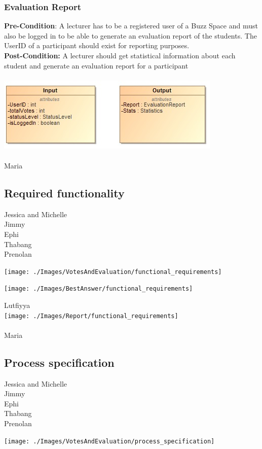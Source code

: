 \documentclass[a4paper,11pt]{article}
\begin{document}
\subsubsection{Evaluation Report}
\textbf{Pre-Condition}: A lecturer has to be a registered user of a Buzz Space and must also be logged in to be able to generate an evaluation report of the students. The UserID of a participant should exist for reporting purposes.
\\
\textbf{Post-Condition:} A lecturer should get statistical information about each student and generate an evaluation report for a participant
\\
\\
\includegraphics{Images/Report/Input&Output}
\\
\\
Maria\\

\subsection{Required functionality}
Jessica and Michelle\\
Jimmy\\
Ephi\\
Thabang\\
Prenolan\\
\begin{center}
\texttt{[image: ./Images/VotesAndEvaluation/functional\_requirements]}
\end{center}

\begin{center}
\texttt{[image: ./Images/BestAnswer/functional\_requirements]}
\end{center}

Lutfiyya\\
\texttt{[image: ./Images/Report/functional\_requirements]}\\
\\

Maria\\

\subsection{Process specification}
Jessica and Michelle\\
Jimmy\\
Ephi\\
Thabang\\
Prenolan\\
\begin{center}
\texttt{[image: ./Images/VotesAndEvaluation/process\_specification]}
\end{center}
\end{document}
